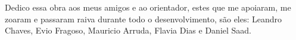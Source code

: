 Dedico essa obra aos meus amigos e ao orientador, estes que me apoiaram, me zoaram e passaram raiva durante todo o desenvolvimento, são eles: Leandro Chaves, Evio Fragoso, Mauricio Arruda, Flavia Dias e Daniel Saad.